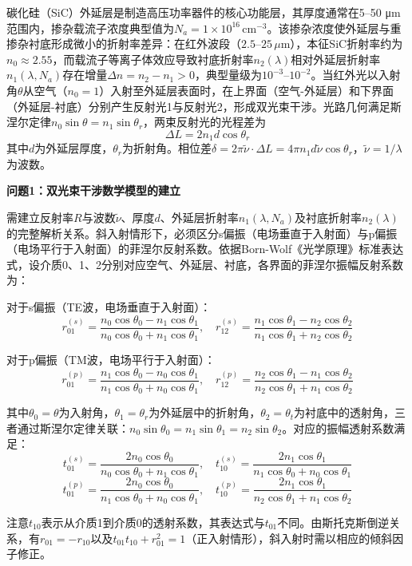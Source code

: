 \documentclass{mcmthesis}
\begin{document}
碳化硅（SiC）外延层是制造高压功率器件的核心功能层，其厚度通常在5–50 μm范围内，掺杂载流子浓度典型值为$N_a = 1\times 10^{16}\,\mathrm{cm}^{-3}$。该掺杂浓度使外延层与重掺杂衬底形成微小的折射率差异：在红外波段（$2.5$–$25\,\mu\mathrm{m}$），本征SiC折射率约为$n_0 \approx 2.55$，而载流子等离子体效应导致衬底折射率$n_2(\lambda)$相对外延层折射率$n_1(\lambda, N_a)$存在增量$\Delta n = n_2 - n_1 > 0$，典型量级为$10^{-3}$–$10^{-2}$。当红外光以入射角$\theta$从空气（$n_0=1$）入射至外延层表面时，在上界面（空气-外延层）和下界面（外延层-衬底）分别产生反射光1与反射光2，形成双光束干涉。光路几何满足斯涅尔定律$n_0\sin\theta = n_1\sin\theta_r$，两束反射光的光程差为
$$\Delta L = 2n_1 d \cos\theta_r \tag{1}$$
其中$d$为外延层厚度，$\theta_r$为折射角。相位差$\delta = 2\pi\tilde{\nu}\cdot\Delta L = 4\pi n_1 d\tilde{\nu}\cos\theta_r$，$\tilde{\nu}=1/\lambda$为波数。

\textbf{问题1：双光束干涉数学模型的建立}

需建立反射率$R$与波数$\tilde{\nu}$、厚度$d$、外延层折射率$n_1(\lambda, N_a)$及衬底折射率$n_2(\lambda)$的完整解析关系。斜入射情形下，必须区分s偏振（电场垂直于入射面）与p偏振（电场平行于入射面）的菲涅尔反射系数。依据Born-Wolf《光学原理》标准表达式，设介质0、1、2分别对应空气、外延层、衬底，各界面的菲涅尔振幅反射系数为：

对于s偏振（TE波，电场垂直于入射面）：
$$r_{01}^{(s)} = \frac{n_0\cos\theta_0 - n_1\cos\theta_1}{n_0\cos\theta_0 + n_1\cos\theta_1}, \quad r_{12}^{(s)} = \frac{n_1\cos\theta_1 - n_2\cos\theta_2}{n_1\cos\theta_1 + n_2\cos\theta_2} \tag{2}$$

对于p偏振（TM波，电场平行于入射面）：
$$r_{01}^{(p)} = \frac{n_1\cos\theta_0 - n_0\cos\theta_1}{n_1\cos\theta_0 + n_0\cos\theta_1}, \quad r_{12}^{(p)} = \frac{n_2\cos\theta_1 - n_1\cos\theta_2}{n_2\cos\theta_1 + n_1\cos\theta_2} \tag{3}$$

其中$\theta_0 = \theta$为入射角，$\theta_1 = \theta_r$为外延层中的折射角，$\theta_2 = \theta_t$为衬底中的透射角，三者通过斯涅尔定律关联：$n_0\sin\theta_0 = n_1\sin\theta_1 = n_2\sin\theta_2$。对应的振幅透射系数满足：
$$t_{01}^{(s)} = \frac{2n_0\cos\theta_0}{n_0\cos\theta_0 + n_1\cos\theta_1}, \quad t_{10}^{(s)} = \frac{2n_1\cos\theta_1}{n_1\cos\theta_0 + n_0\cos\theta_1} \tag{4}$$
$$t_{01}^{(p)} = \frac{2n_0\cos\theta_0}{n_1\cos\theta_0 + n_0\cos\theta_1}, \quad t_{10}^{(p)} = \frac{2n_1\cos\theta_1}{n_2\cos\theta_1 + n_1\cos\theta_2} \tag{5}$$

注意$t_{10}$表示从介质1到介质0的透射系数，其表达式与$t_{01}$不同。由斯托克斯倒逆关系，有$r_{01} = -r_{10}$以及$t_{01}t_{10} + r_{01}^2 = 1$（正入射情形），斜入射时需以相应的倾斜因子修正。
\end{document}

